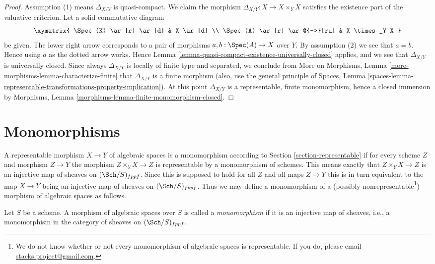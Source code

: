 \begin{proof}
Assumption (1) means $\Delta_{X/Y}$ is quasi-compact.
We claim the morphism
$\Delta_{X/Y} : X \to X \times_Y X$ satisfies the existence
part of the valuative criterion.
Let a solid commutative diagram
$$
\xymatrix{
\Spec(K) \ar[r] \ar[d] & X \ar[d] \\
\Spec(A) \ar[r] \ar@{-->}[ru] & X \times_Y X
}
$$
be given. The lower right arrow corresponds to a
pair of morphisms $a, b : \Spec(A) \to X$ over $Y$.
By assumption (2) we see that $a = b$. Hence using $a$ as the dotted
arrow works. Hence
Lemma \ref{lemma-quasi-compact-existence-universally-closed}
applies, and we see that $\Delta_{X/Y}$ is universally closed.
Since always $\Delta_{X/Y}$ is locally of finite type and
separated, we conclude from
More on Morphisms, Lemma \ref{more-morphisms-lemma-characterize-finite}
that $\Delta_{X/Y}$ is a finite morphism (also, use the
general principle of
Spaces, Lemma
\ref{spaces-lemma-representable-transformations-property-implication}).
At this point $\Delta_{X/Y}$ is a representable, finite monomorphism,
hence a closed immersion by
Morphisms, Lemma \ref{morphisms-lemma-finite-monomorphism-closed}.
\end{proof}






\section{Monomorphisms}
\label{section-monomorphisms}

\noindent
A representable morphism $X \to Y$ of algebraic spaces is a monomorphism
according to Section \ref{section-representable} if for every scheme
$Z$ and morphism $Z \to Y$ the morphism $Z \times_Y X \to Z$
is representable by a monomorphism of schemes.
This means exactly that $Z \times_Y X \to Z$
is an injective map of sheaves on $(\Sch/S)_{fppf}$. Since this
is supposed to hold for all $Z$ and all maps $Z \to Y$ this is in turn
equivalent to the map $X \to Y$ being an injective map of sheaves on
$(\Sch/S)_{fppf}$. Thus we may define a monomorphism of a (possibly
nonrepresentable\footnote{We do not know whether or not every monomorphism
of algebraic spaces is representable. If you do, please email
\href{mailto:stacks.project@gmail.com}{stacks.project@gmail.com}.})
morphism of algebraic spaces as follows.

\begin{definition}
\label{definition-monomorphism}
Let $S$ be a scheme.
A morphism of algebraic spaces over $S$ is called a {\it monomorphism}
if it is an injective map of sheaves, i.e., a monomorphism in the category
of sheaves on $(\Sch/S)_{fppf}$.
\end{definition}

